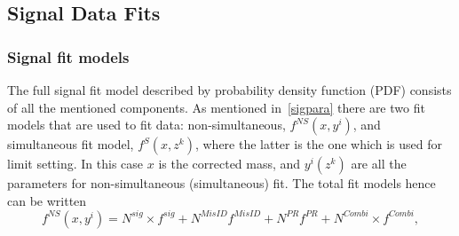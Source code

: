 %
%
\subsection{Signal Data Fits}
\label{fitsens}


\subsubsection{Signal fit models}
The full signal fit model described by probability density function (PDF) consists of all the mentioned components. As mentioned in~\autoref{sigpara} there are two fit models that are used to fit data: non-simultaneous, $f^{NS}(x,y^{i})$, and simultaneous fit model, $f^{S}(x,{z^{k}})$, where the latter is the one which is used for limit setting. In this case $x$ is the corrected mass, and $y^{i}(z^{k})$ are all the parameters for non-simultaneous (simultaneous) fit. The total fit models hence can be written 
\begin{equation}
f^{NS}(x,y^{i})=N^{sig}\times f^{sig} + N^{MisID}f^{MisID} + N^{PR}f^{PR} + N^{Combi} \times f^{Combi},
\label{eq:fullhypo}
\end{equation}

